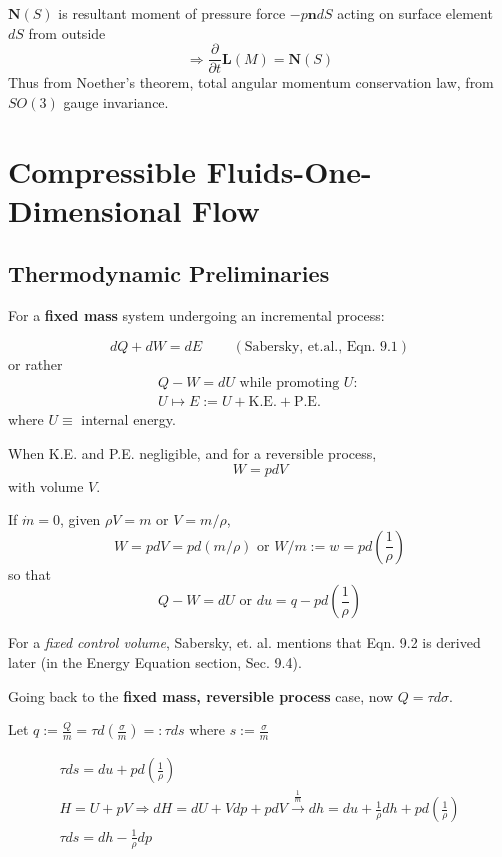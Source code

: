 \documentclass[twoside,landscape,10pt]{amsart}
\theoremstyle{plain}
\theoremstyle{definition}
\theoremstyle{remark}
\theoremstyle{remark}
\begin{document}
\begin{multicols*}{2}
$\mathbf{N}(S)$ is resultant moment of pressure force $-p\mathbf{n}dS$ acting on surface element $dS$ from outside
\[
\Longrightarrow \frac{ \partial }{ \partial t} \mathbf{L}(M) = \mathbf{N}(S)
\]
Thus from Noether's theorem, total angular momentum conservation law, from $SO(3)$ gauge invariance.  



\section{Compressible Fluids-One-Dimensional Flow}

\subsection{Thermodynamic Preliminaries}

For a \textbf{fixed mass} system undergoing an incremental process:

\begin{equation}
dQ + dW = dE \qquad \, (\text{Sabersky, et.al., Eqn. 9.1})
\end{equation}
or rather
\begin{equation}
\begin{gathered} 
Q - W = dU \text{ while promoting $U$: } \\
U \mapsto E := U + \text{K.E.} + \text{P.E.} 
\end{gathered}
\end{equation}
where $U \equiv $ internal energy.

When K.E. and P.E. negligible, and for a reversible process, 
\begin{equation}
W = pdV
\end{equation} 	
with volume $V$.

If $\dot{m} = 0$, given $\rho V = m$ or $V = m / \rho$, 
\[
W = pdV = pd(m/\rho ) \text{ or } W / m := w = p d\left( \frac{1}{\rho } \right) 
\]
so that 
\[
Q -W = dU \text{ or } du = q - p d \left(\frac{1}{\rho} \right) 
\]

For a \emph{fixed control volume}, Sabersky, et. al. \cite{SAHG1998} mentions that Eqn. 9.2 is derived later (in the Energy Equation section, Sec. 9.4). 

Going back to the \textbf{fixed mass, reversible process} case, now $Q = \tau d\sigma$. 

Let $q := \frac{Q}{m} = \tau d\left( \frac{\sigma}{m} \right) =: \tau ds$ where $s := \frac{\sigma}{m}$

\begin{equation}
\begin{gathered}
\tau ds = du + p d\left( \frac{1}{\rho} \right) \\
H = U + pV \Longrightarrow dH = dU + Vdp + pdV \xrightarrow{\frac{1}{m}} dh = du + \frac{1}{\rho} dh + pd\left( \frac{1}{\rho} \right) \\
\tau ds = dh - \frac{1}{\rho} dp
\end{gathered}
\end{equation}


\end{multicols*}
\end{document}
